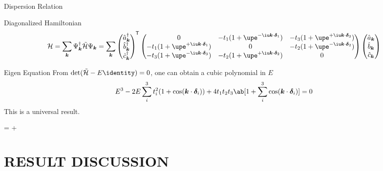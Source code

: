\documentclass[svgnames, aspectratio = 1610]{beamer}
\begin{document}
\begin{frame}{Dispersion Relation}
  \begin{block}{Diagonalized Hamiltonian}
    \begin{equation}
      \mathcal H
    = \sum_{\bm k} \Psi_{\bm k}^\dagger \tilde{\mathcal H} \Psi_{\bm k}
    = \sum_{\bm k}
      \begin{pmatrix}
        \hat a_{\bm k}^\dagger\\ \hat b_{\bm k}^\dagger\\ \hat c_{\bm k}^\dagger
      \end{pmatrix}^{\mkern-1.5mu\mathsf T}
      \begin{pmatrix}
        0 & -t_1(1 + \upe^{-\iu\bm k\cdot\bm\delta_1})
          & -t_3(1 + \upe^{+\iu\bm k\cdot\bm\delta_3})\\
            -t_1(1 + \upe^{+\iu\bm k\cdot\bm\delta_1}) & 0
          & -t_2(1 + \upe^{-\iu\bm k\cdot\bm\delta_2})\\
            -t_3(1 + \upe^{-\iu\bm k\cdot\bm\delta_3}) &
            -t_2(1 + \upe^{+\iu\bm k\cdot\bm\delta_2}) & 0
      \end{pmatrix}
      \begin{pmatrix}
        \hat a_{\bm k}\\ \hat b_{\bm k}\\ \hat c_{\bm k}
      \end{pmatrix}
      \label{eq:diagonalized_Hamiltonian}
    \end{equation}
  \end{block}
  \pause
  \begin{exampleblock}{Eigen Equation}
    From $\det(\tilde{\mathcal H} - E\identity) = 0$, one
    can obtain a cubic polynomial in $E$
    \begin{equation}
      E^3 - 2E \sum_i^3 t_i^2 (1 + \cos(\bm k \cdot \bm\delta_i))
      + 4t_1t_2t_3 \ab[1 + \sum_i^3 \cos(\bm k \cdot \bm\delta_i)] = 0
      \label{eq:dispersion_relation_expand}
    \end{equation}
    This is a universal result.
  \end{exampleblock}
  \pause
  \begin{alertblock}{}\centering \Large
     =
     + 
  \end{alertblock}
\end{frame}

\section{RESULT DISCUSSION}
\end{document}
